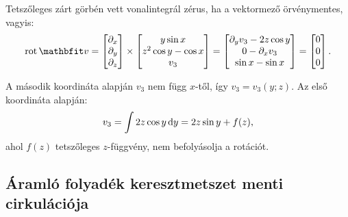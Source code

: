 \documentclass{szb-practice}
\begin{document}
Tetszőleges zárt görbén vett vonalintegrál zérus, ha a vektormező örvénymentes,
vagyis:
$$
  \rot \rvec v = \begin{bmatrix}
    \partial_x \\ \partial_y \\ \partial_z
  \end{bmatrix} \times \begin{bmatrix}
    y \sin x \\ z^2 \cos y - \cos x \\ v_3
  \end{bmatrix} = \begin{bmatrix}
    \partial_y v_3 - 2z \cos y \\
    0 - \partial_x v_3         \\
    \sin x - \sin x
  \end{bmatrix} = \begin{bmatrix}
    0 \\ 0 \\ 0
  \end{bmatrix}
  \text.
$$

A második koordináta alapján $v_3$ nem függ $x$-től, így $v_3 = v_3(y; z)$. Az
első koordináta alapján:
$$
  v_3 = \int 2z \cos y \mathop{}\!\mathrm{d} y = 2z \sin y + f(z)
  \text,
$$
ahol $f(z)$ tetszőleges $z$-függvény, nem befolyásolja a rotációt.

\subsection{Áramló folyadék keresztmetszet menti cirkulációja}
\end{document}
